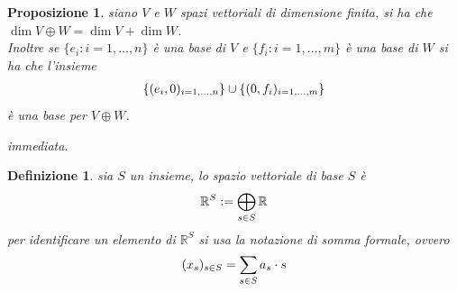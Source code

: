 \documentclass[oneside, 11pt]{amsbook}
\makeatletter
\newcommand{\0}{{(0)}}
\newcommand{\3}{{(3)}}
\theoremstyle{colonplain}
\newtheorem{prop}[thm]{Proposizione}
\theoremstyle{colondefinition}
\newtheorem{defn}[thm]{Definizione}
\theoremstyle{colonremark}
\numberwithin{equation}{chapter}
\renewcommand{\proofname}{Dimostrazione}
\renewenvironment{proof}[1][\proofname]{\par
  \pushQED{\qed}%
  \normalfont \topsep6\p@\@plus6\p@\relax
  \trivlist
  \item[\hskip\labelsep\bfseries #1:]\ignorespaces
}{%
  \popQED\endtrivlist\@endpefalse
}
\makeatother
\begin{document}
\begin{prop} siano $V$ e $W$ spazi vettoriali di dimensione finita, si ha che $\dim V \oplus W = \dim V + \dim W$. \\
Inoltre se $\{ e_i : i = 1, \dots, n \}$ è una base di $V$ e $\{ f_i : i = 1, \dots, m \}$ è una base di $W$ si ha che l'insieme
\begin{align}
    \{ (e_i, 0)_{i = 1, \dots, n} \} \cup \{ (0, f_i)_{i = 1, \dots, m} \} \notag
\end{align}
è una base per $V \oplus W$. \\

\begin{proof} immediata. \end{proof}
\end{prop}
\begin{defn} sia $S$ un insieme, lo \textit{spazio vettoriale di base} $S$ è
\begin{align}
    \mathbb{R}^S := \bigoplus_{s \in S} \mathbb{R} \notag
\end{align}
per identificare un elemento di $\mathbb{R}^S$ si usa la notazione di somma formale, ovvero
\begin{align}
    (x_s)_{s \in S} = \sum_{s \in S} a_s \cdot s \notag
\end{align}

\end{defn}
\end{document}
